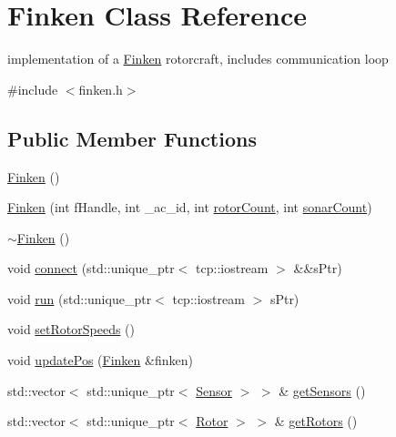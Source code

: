 \hypertarget{classFinken}{}\section{Finken Class Reference}
\label{classFinken}


implementation of a \hyperlink{classFinken}{Finken} rotorcraft, includes communication loop  




{\ttfamily \#include $<$finken.\+h$>$}

\subsection*{Public Member Functions}
\begin{DoxyCompactItemize}
\item 
\hyperlink{classFinken_afb256567ee9aa96c409fdb0529b4f228}{Finken} ()
\item 
\hyperlink{classFinken_a26a9cd42385ec3ae010e2ad1387d9ce6}{Finken} (int f\+Handle, int \+\_\+ac\+\_\+id, int \hyperlink{classFinken_a2de6be70e0baaf63641df0214bf1f7a2}{rotor\+Count}, int \hyperlink{classFinken_a92ae4d32222c44c17a4cea91055569d9}{sonar\+Count})
\item 
\hyperlink{classFinken_a94e6a3b5b14ec7ee351d219eb17be45b}{$\sim$\+Finken} ()
\item 
void \hyperlink{classFinken_aa4779668e3bf85253e371b30e0da808a}{connect} (std\+::unique\+\_\+ptr$<$ tcp\+::iostream $>$ \&\&s\+Ptr)
\item 
void \hyperlink{classFinken_ae3c3abbf571407e210f4b03b68cada9d}{run} (std\+::unique\+\_\+ptr$<$ tcp\+::iostream $>$ s\+Ptr)
\item 
void \hyperlink{classFinken_aaead1098c0752c8ec5b99bccd9945f3b}{set\+Rotor\+Speeds} ()
\item 
void \hyperlink{classFinken_afddc56af42f000ff17c4a00779b4ad6a}{update\+Pos} (\hyperlink{classFinken}{Finken} \&finken)
\item 
std\+::vector$<$ std\+::unique\+\_\+ptr$<$ \hyperlink{classSensor}{Sensor} $>$ $>$ \& \hyperlink{classFinken_a1215883fb6df7c4853e498dec43b4e6a}{get\+Sensors} ()
\item 
std\+::vector$<$ std\+::unique\+\_\+ptr$<$ \hyperlink{classRotor}{Rotor} $>$ $>$ \& \hyperlink{classFinken_a610ce496f1c5f2ca22850ee26c54510c}{get\+Rotors} ()
\end{DoxyCompactItemize}
